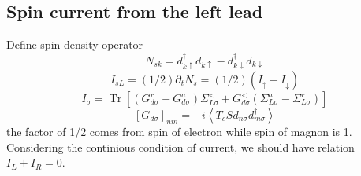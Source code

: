 \documentclass[11pt,a4paper]{article}
\begin{document}
\subsection{Spin current from the left lead}
Define spin density operator
\begin{equation}
N_{sk} = d_{k \uparrow}^{\dagger} d_{k \uparrow}-d_{k \downarrow}^{\dagger} d_{k \downarrow}
\end{equation}
\begin{equation}
I_{s L}=(1 / 2) \partial_{t} N_{s}=(1 / 2)\left(I_{\uparrow}-I_{\downarrow}\right)
\end{equation}
\begin{equation}
I_{\sigma}=\operatorname{Tr}\left[\left(G_{d \sigma}^{r}-G_{d \sigma}^{a}\right) \Sigma_{L \sigma}^{<}+G_{d \sigma}^{<}\left(\Sigma_{L \sigma}^{a}-\Sigma_{L \sigma}^{r}\right)\right]
\end{equation}
\begin{equation}
\left[G_{d \sigma}\right]_{n m}=-i\left\langle T_{c} S d_{n \sigma} d_{m \sigma}^{\dagger}\right\rangle
\end{equation}
the factor of 1/2 comes from spin of electron while spin of magnon is 1. Considering the continious condition of current, we should have relation $I_{L} + I_{R} = 0$.
\end{document}
